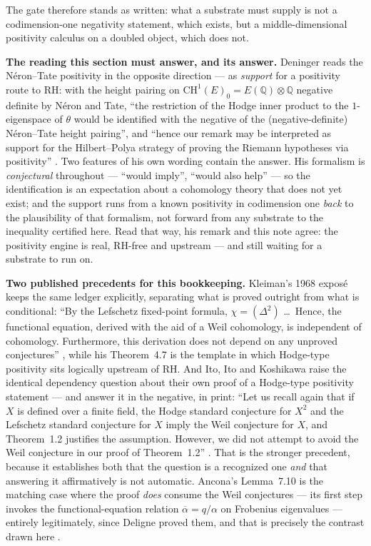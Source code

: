 \documentclass[11pt]{article}
\theoremstyle{definition}
\theoremstyle{remark}
\begin{document}
\noindent The gate therefore stands as written: what a substrate must supply is not a
codimension-one negativity statement, which exists, but a middle-dimensional positivity calculus
on a doubled object, which does not.

\medskip

\noindent\textbf{The reading this section must answer, and its answer.} Deninger reads the
N\'eron--Tate positivity in the opposite direction --- as \emph{support} for a positivity route
to RH: with the height pairing on $\mathrm{CH}^1(E)_0 = E(\mathbb{Q}) \otimes \mathbb{Q}$
negative definite by N\'eron and Tate, ``the restriction of the Hodge inner product to the
$1$-eigenspace of $\theta$ would be identified with the negative of the (negative-definite)
N\'eron--Tate height pairing'', and ``hence our remark may be interpreted as support for the
Hilbert--Polya strategy of proving the Riemann hypotheses via positivity''
\cite[\S1]{DeningerHP}. Two features of his own wording contain the answer. His formalism is
\emph{conjectural} throughout --- ``would imply'', ``would also help'' --- so the identification
is an expectation about a cohomology theory that does not yet exist; and the support runs from a
known positivity in codimension one \emph{back} to the plausibility of that formalism, not
forward from any substrate to the inequality certified here. Read that way, his remark and this
note agree: the positivity engine is real, RH-free and upstream --- and still waiting for a
substrate to run on.

\medskip

\noindent\textbf{Two published precedents for this bookkeeping.} Kleiman's 1968 expos\'e keeps
the same ledger explicitly, separating what is proved outright from what is conditional: ``By the
Lefschetz fixed-point formula, $\chi = (\Delta^2)$ \ldots\ Hence, the functional equation,
derived with the aid of a Weil cohomology, is independent of cohomology. Furthermore, this
derivation does not depend on any unproved conjectures'' \cite[Rmk.~4.5, p.~385]{Kleiman}, while
his Theorem~4.7 is the template in which Hodge-type positivity sits logically upstream of RH. And
Ito, Ito and Koshikawa raise the identical dependency question about their own proof of a
Hodge-type positivity statement --- and answer it in the negative, in print: ``Let us recall again
that if $X$ is defined over a finite field, the Hodge standard conjecture for $X^2$ and the
Lefschetz standard conjecture for $X$ imply the Weil conjecture for $X$, and Theorem~1.2 justifies
the assumption. However, we did not attempt to avoid the Weil conjecture in our proof of
Theorem~1.2'' \cite[Rmk.~1.3]{IIK}. That is the stronger precedent, because it establishes both
that the question is a recognized one \emph{and} that answering it affirmatively is not
automatic. Ancona's Lemma~7.10 is the matching case where the proof \emph{does} consume the Weil
conjectures --- its first step invokes the functional-equation relation
$\overline{\alpha} = q/\alpha$ on Frobenius eigenvalues --- entirely legitimately, since Deligne
proved them, and that is precisely the contrast drawn here \cite[Lem.~7.10]{Ancona}.
\end{document}

